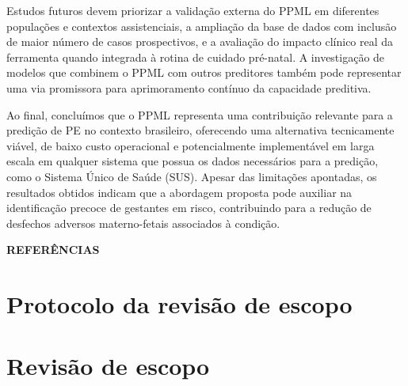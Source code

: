 \documentclass[12pt, a4paper]{report}
\theoremstyle{definition}
\theoremstyle{remark}
\theoremstyle{plain}
\begin{document}
Estudos futuros devem priorizar a validação externa do PPML em diferentes populações e contextos assistenciais, a ampliação da base de dados com inclusão de maior número de casos prospectivos, e a avaliação do impacto clínico real da ferramenta quando integrada à rotina de cuidado pré-natal. A investigação de modelos que combinem o PPML com outros preditores também pode representar uma via promissora para aprimoramento contínuo da capacidade preditiva.

Ao final, concluímos que o PPML representa uma contribuição relevante para a predição de PE no contexto brasileiro, oferecendo uma alternativa tecnicamente viável, de baixo custo operacional e potencialmente implementável em larga escala em qualquer sistema que possua os dados necessários para a predição, como o Sistema Único de Saúde (SUS). Apesar das limitações apontadas, os resultados obtidos indicam que a abordagem proposta pode auxiliar na identificação precoce de gestantes em risco, contribuindo para a redução de desfechos adversos materno-fetais associados à condição.


\cleardoublepage
{}
{}
\begin{center}
\bfseries\MakeUppercase{Referências}
\end{center}
\vspace{1cm}
\printbibliography[heading=none]


\cleardoublepage
{}
\appendix
\renewcommand{\thechapter}{\Alph{chapter}}

\chapter{Protocolo da revisão de escopo}
\label{anx:protocolo}
\thispagestyle{myheadings}




\chapter{Revisão de escopo}
\label{anx:revisao}
\thispagestyle{myheadings}

\cleardoublepage


\cleardoublepage
\end{document}
